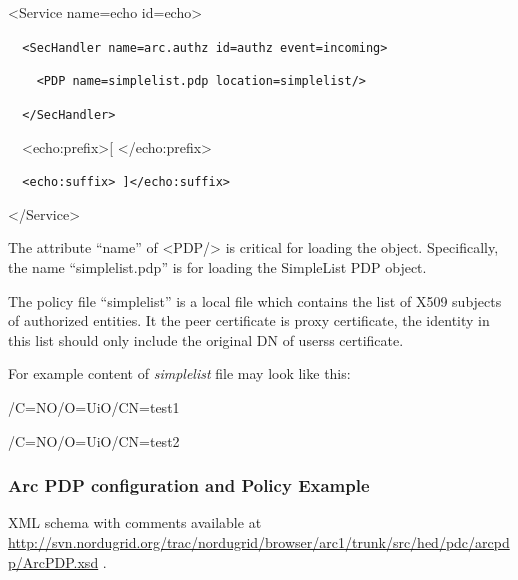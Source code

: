 \documentclass[a4paper]{article}
\begin{document}
{\ttfamily\color{black}
{\textless}Service name={\textquotedbl}echo{\textquotedbl}
id={\textquotedbl}echo{\textquotedbl}{\textgreater}}

{\upshape\color{black}
\foreignlanguage{spanish}{\texttt{\ \ }}\texttt{{\textless}SecHandler
name={\textquotedbl}arc.authz{\textquotedbl}
id={\textquotedbl}authz{\textquotedbl}
event={\textquotedbl}incoming{\textquotedbl}{\textgreater}}}

{\upshape\color{black}
\texttt{\ \ \ \ {\textless}PDP
name={\textquotedbl}}\texttt{simplelist}\texttt{.pdp{\textquotedbl}}\texttt{
location=}\texttt{{\textquotedbl}}\texttt{simplelist}\texttt{{\textquotedbl}}\texttt{/}\texttt{{\textgreater}}}

{\upshape\color{black}
\texttt{\ \ }\foreignlanguage{spanish}{\texttt{{\textless}/SecHandler{\textgreater}}}}

{\ttfamily\color{black}
\ \ {\textless}echo:prefix{\textgreater}[
{\textless}/echo:prefix{\textgreater}}

{\upshape\color{black}
\foreignlanguage{spanish}{\texttt{\ \ }}\texttt{{\textless}echo:suffix{\textgreater}
]{\textless}/echo:suffix{\textgreater}}}

{\ttfamily\color{black}
{\textless}/Service{\textgreater}}

{\color{black}
The attribute {\textquotedblleft}name{\textquotedblright} of
{\textless}PDP/{\textgreater} is critical for loading the object.
Specifically, the name
{\textquotedblleft}simplelist.pdp{\textquotedblright} is for loading
the SimpleList PDP object.}

{\upshape\color{black}
The policy file {\textquotedblleft}simplelist{\textquotedblright} is a
local file which contains the list of X509 subjects of authorized
entities. It the peer certificate is proxy certificate, the identity in
this list should only include the original DN of
users{\textquotesingle}s certificate.}

{\upshape\color{black}
For example content of \textit{simplelist} file may look like this:}

{\color{black}
/C=NO/O=UiO/CN=test1}

{\color{black}
/C=NO/O=UiO/CN=test2}

\subsubsection[Arc PDP configuration and Policy Example]{Arc PDP
configuration and Policy Example}
\label{bkm:Ref204009974}{\upshape\color{black}
XML schema with comments available at
\url{http://svn.nordugrid.org/trac/nordugrid/browser/arc1/trunk/src/hed/pdc/arcpdp/ArcPDP.xsd}
.}
\end{document}
